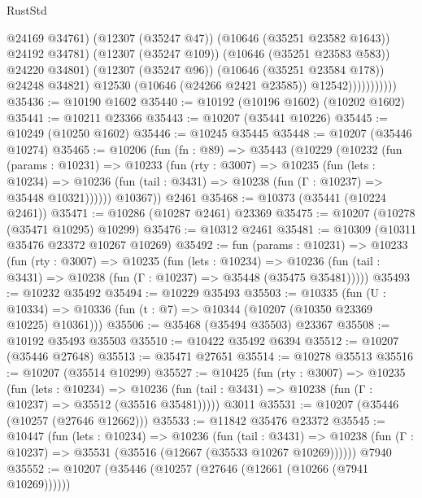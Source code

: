 \begin{lexlean}{RustStd}
\begin{coremodule}
                                  @24169
                                  @34761)
                                (@12307 (@35247 @47))
                                (@10646 (@35251 @23582 @1643))
                                @24192
                                @34781)
                              (@12307 (@35247 @109))
                              (@10646 (@35251 @23583 @583))
                              @24220
                              @34801)
                            (@12307 (@35247 @96))
                            (@10646 (@35251 @23584 @178))
                            @24248
                            @34821)
                          @12530
                          (@10646 (@24266 @2421 @23585))
                          @12542)))))))))))
@35436 := @10190 @1602
@35440 := @10192 (@10196 @1602) (@10202 @1602)
@35441 := @10211 @23366
@35443 := @10207 (@35441 @10226)
@35445 := @10249 (@10250 @1602)
@35446 := @10245 @35445
@35448 := @10207 (@35446 @10274)
@35465 := @10206
    (fun (fn : @89) =>
    @35443
      (@10229
        (@10232
          (fun (params : @10231) =>
          @10233
            (fun (rty : @3007) =>
            @10235
              (fun (lets : @10234) =>
              @10236 (fun (tail : @3431) => @10238 (fun (Γ : @10237) => @35448 @10321))))))
        @10367))
    @2461
@35468 := @10373 (@35441 (@10224 @2461))
@35471 := @10286 (@10287 @2461) @23369
@35475 := @10207 (@10278 (@35471 @10295) @10299)
@35476 := @10312 @2461
@35481 := @10309 (@10311 @35476 @23372 @10267 @10269)
@35492 := fun (params : @10231) =>
  @10233
    (fun (rty : @3007) =>
    @10235
      (fun (lets : @10234) =>
      @10236 (fun (tail : @3431) => @10238 (fun (Γ : @10237) => @35448 (@35475 @35481)))))
@35493 := @10232 @35492
@35494 := @10229 @35493
@35503 := @10335
    (fun (U : @10334) => @10336 (fun (t : @7) => @10344 (@10207 (@10350 @23369 @10225) @10361)))
@35506 := @35468 (@35494 @35503) @23367
@35508 := @10192 @35493 @35503
@35510 := @10422 @35492 @6394
@35512 := @10207 (@35446 @27648)
@35513 := @35471 @27651
@35514 := @10278 @35513
@35516 := @10207 (@35514 @10299)
@35527 := @10425
    (fun (rty : @3007) =>
    @10235
      (fun (lets : @10234) =>
      @10236 (fun (tail : @3431) => @10238 (fun (Γ : @10237) => @35512 (@35516 @35481)))))
    @3011
@35531 := @10207 (@35446 (@10257 (@27646 @12662)))
@35533 := @11842 @35476 @23372
@35545 := @10447
    (fun (lets : @10234) =>
    @10236
      (fun (tail : @3431) =>
      @10238 (fun (Γ : @10237) => @35531 (@35516 (@12667 (@35533 @10267 @10269))))))
    @7940
@35552 := @10207 (@35446 (@10257 (@27646 (@12661 (@10266 (@7941 @10269))))))

\end{coremodule}
\end{lexlean}
